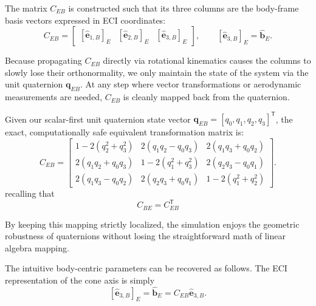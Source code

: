 The matrix \(C_{EB}\) is constructed such that its three columns are the body-frame basis vectors expressed in ECI coordinates:
\begin{equation}
C_{EB}
=
\begin{bmatrix}
[\hat{\mathbf e}_{1,B}]_E &
[\hat{\mathbf e}_{2,B}]_E &
[\hat{\mathbf e}_{3,B}]_E
\end{bmatrix},
\qquad
[\hat{\mathbf e}_{3,B}]_E=\hat{\mathbf b}_E.
\label{eq:dcm_definition}
\end{equation}

Because propagating \(C_{EB}\) directly via rotational kinematics causes the columns to slowly lose their orthonormality, we only maintain the state of the system via the unit quaternion $\mathbf{q}_{EB}$. At any step where vector transformations or aerodynamic measurements are needed, \(C_{EB}\) is cleanly mapped back from the quaternion. 

Given our scalar-first unit quaternion state vector $\mathbf{q}_{EB} = [q_0, q_1, q_2, q_3]^{\mathsf T}$, the exact, computationally safe equivalent transformation matrix is:
\begin{equation}
C_{EB} = \begin{bmatrix}
1 - 2(q_2^2 + q_3^2) & 2(q_1q_2 - q_0q_3) & 2(q_1q_3 + q_0q_2) \\[4pt]
2(q_1q_2 + q_0q_3) & 1 - 2(q_1^2 + q_3^2) & 2(q_2q_3 - q_0q_1) \\[4pt]
2(q_1q_3 - q_0q_2) & 2(q_2q_3 + q_0q_1) & 1 - 2(q_1^2 + q_2^2)
\end{bmatrix}. \label{eq:quat_to_dcm}
\end{equation}
recalling that
\begin{equation}
C_{BE}=C_{EB}^{\mathsf T}    
\end{equation}

By keeping this mapping strictly localized, the simulation enjoys the geometric robustness of quaternions without losing the straightforward math of linear algebra mapping.

The intuitive body-centric parameters can be recovered as follows. The ECI representation of the cone axis is simply
\[
[\hat{\mathbf e}_{3,B}]_E = \hat{\mathbf b}_E = C_{EB}\hat{\mathbf e}_{3,B}.
\]

